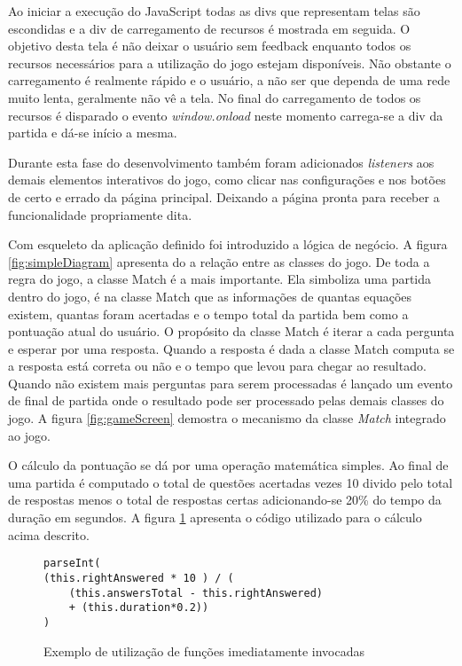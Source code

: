 Ao iniciar a execução do JavaScript todas as divs que representam
telas são escondidas e a div de carregamento de recursos é mostrada em
seguida. O objetivo desta tela é não deixar o usuário sem feedback enquanto
todos os recursos necessários para a utilização do jogo estejam disponíveis.
Não obstante o carregamento é realmente rápido e o usuário, a não ser que 
dependa de uma rede muito lenta, geralmente não vê a tela.
No final do carregamento de todos os recursos é disparado o
evento \textit{window.onload} neste momento carrega-se a div da partida
e dá-se início a mesma.

Durante esta fase do desenvolvimento também foram adicionados
\textit{listeners} aos demais elementos interativos do jogo, como
clicar nas configurações e nos botões de certo e errado da página
principal. Deixando a página  pronta para receber a funcionalidade 
propriamente dita.

Com esqueleto da aplicação definido foi introduzido a
lógica de negócio. A figura \ref{fig:simpleDiagram} apresenta do
a relação entre as classes do jogo. De toda a regra do jogo, a
classe Match é a mais importante. Ela simboliza uma partida dentro do
jogo, é na classe Match que as informações de quantas equações
existem, quantas foram acertadas e o tempo total da partida bem como
a pontuação atual do usuário. O propósito da classe Match é iterar a cada
pergunta e esperar por uma resposta. Quando a resposta é dada a classe
Match computa se a resposta está correta ou não e o tempo que levou
para chegar ao resultado. Quando não existem mais perguntas para serem
processadas é lançado um evento de final de partida onde o resultado
pode ser processado pelas demais classes do jogo.
A figura \ref{fig:gameScreen} demostra o mecanismo da classe \textit{Match} integrado
ao jogo.

O cálculo da pontuação se dá por uma operação matemática simples.
Ao final de uma partida é computado o total de questões acertadas
vezes 10 divido pelo total de respostas menos o total de respostas
certas adicionando-se 20\% do tempo da duração em segundos. A figura
\ref{fig:punctuationCalculation} apresenta o código utilizado para o
cálculo acima descrito.

\begin{figure}
\centering
\begin{verbatim}
parseInt(
(this.rightAnswered * 10 ) / (
    (this.answersTotal - this.rightAnswered) 
    + (this.duration*0.2))
)
\end{verbatim}
\caption{Exemplo de utilização de funções imediatamente invocadas}
\label{fig:punctuationCalculation}
\end{figure}


